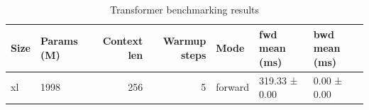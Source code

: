 \begin{table}
\caption{Transformer benchmarking results}
\label{tab:benchmarks}
\begin{tabular}{llrrlll}
\toprule
Size & Params (M) & Context len & Warmup steps & Mode & fwd mean (ms) & bwd mean (ms) \\
\midrule
xl & 1998 & 256 & 5 & forward & 319.33 ± 0.00 & 0.00 ± 0.00 \\
\bottomrule
\end{tabular}
\end{table}
